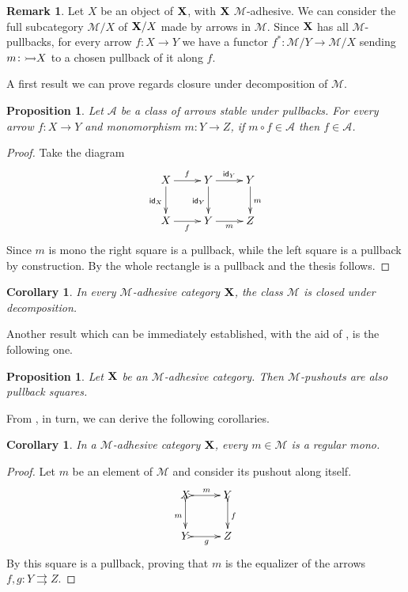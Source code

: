 \documentclass[a4paper]{article}
\newcommand{\id}[1]{\mathsf{id}_{#1}}
\newcommand{\mto}[0]{\scalebox{1}{$\rightarrowtail$}}
\def\X{\textbf {\textup{X}}}
\def\Y{\textbf {\textup{Y}}}
\newtheorem{proposition}[theorem]{Proposition}
\newtheorem{corollary}[theorem]{Corollary}
\theoremstyle{definition}
\newtheorem{remark}[theorem]{Remark}
\begin{document}
\begin{remark}\label{rem:pb}
	Let $X$ be an object of $\X$, with $\X$ $\mathcal{M}$-adhesive. We can consider  the full subcategory $\mathcal{M}/X$ of $\X/X$ made by arrows in $\mathcal{M}$. Since $\X$ has all $\mathcal{M}$-pullbacks, for every arrow $f\colon X\to Y$ we have a functor $f^*\colon \mathcal{M}/Y\to \mathcal{M}/X $ sending $m\colon \mto X$ to a chosen pullback of it along $f$.
	\end{remark}

A first result we can prove regards closure under decomposition of $\mathcal{M}$.

\begin{proposition}\label{prop:deco}Let  $\mathcal{A}$ be a class of arrows stable under pullbacks. For every arrow $f\colon X\to Y$ and monomorphism $m\colon Y\to Z$, if $m\circ f \in\mathcal{A}$ then $f\in \mathcal{A}$.
\end{proposition}
\begin{proof}Take the diagram
	\[\xymatrix{X \ar[d]_{\id{X}}\ar[r]^{f}& Y \ar[r]^{\id{Y}}  \ar[d]_{\id{Y}}& Y \ar[d]^{m}\\
		X \ar[r]_{f}& Y \ar[r]_{m} & Z}\]
	Since $m$ is mono the right square is a pullback, while the left square is a pullback by construction. By  the whole rectangle is a pullback and the thesis follows.
\end{proof}
\begin{corollary}\label{cor:deco}
	In every $\mathcal{M}$-adhesive category $\X$, the class $\mathcal{M}$ is closed under decomposition.
\end{corollary}

Another result which can be immediately established, with the aid of , is the following one.
\begin{proposition}\label{prop:pbpoad}
	Let $\X$ be an $\mathcal{M}$-adhesive category. Then $\mathcal{M}$-pushouts are also pullback squares.
\end{proposition}

From , in turn, we can derive the following corollaries.
\begin{corollary}\label{cor:rego}
	In a $\mathcal{M}$-adhesive category $\X$, every $m\in\mathcal{M}$ is a regular mono.
\end{corollary}
\begin{proof}
Let $m$ be an element of $\mathcal{M}$ and consider its pushout along itself.
\[\xymatrix{X\ar@{>->}[r]^m \ar@{>->}[d]_m& Y\ar@{>->}[d]^{f}\\Y \ar@{>->}[r]_g & Z}\]
By  this square is a pullback, proving that $m$ is the equalizer of the arrows $f,g\colon Y\rightrightarrows Z$. \qedhere 
\end{proof}
\end{document}
